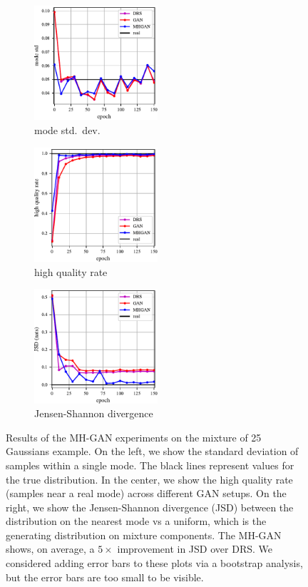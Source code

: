 
\begin{figure}[htbp]
    \centering
    \begin{subfigure}[b]{0.32\textwidth}
       \centering
       \includegraphics[width=1.8in]{figures/std.pdf}
       \caption{mode std.~dev.}
       \label{fig:std}
    \end{subfigure}
    \begin{subfigure}[b]{0.32\textwidth}
       \centering
       \includegraphics[width=1.8in]{figures/hqr.pdf}
       \caption{high quality rate}
       \label{fig:hqr}
    \end{subfigure}
    \begin{subfigure}[b]{0.32\textwidth}
       \centering
       \includegraphics[width=1.8in]{figures/jsd.pdf}
       \caption{Jensen-Shannon divergence}
       \label{fig:jsd}
    \end{subfigure}
    \caption{{\small
    Results of the MH-GAN experiments on the mixture of 25 Gaussians example.
    On the left, we show the standard deviation of samples within a single mode.
    The black lines represent values for the true distribution.
    In the center, we show the high quality rate (samples near a real mode) across different GAN setups.
    On the right, we show the Jensen-Shannon divergence (JSD) between the distribution on the nearest mode vs a uniform, which is the generating distribution on mixture components.
    The MH-GAN shows, on average, a $5 \times$ improvement in JSD over DRS\@.
    We considered adding error bars to these plots via a bootstrap analysis, but the error bars are too small to be visible.
    }}
    \label{fig:mog_metrics}
\end{figure}

